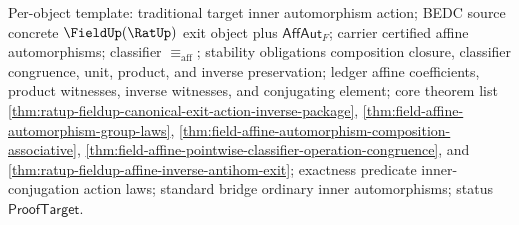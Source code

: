 Per-object template: traditional target inner automorphism action; BEDC source
concrete $\FieldUp(\RatUp)$ exit object plus $\mathsf{AffAut}_F$; carrier
certified affine automorphisms; classifier $\equiv_{\mathrm{aff}}$; stability
obligations composition closure, classifier congruence, unit, product, and
inverse preservation; ledger affine coefficients, product witnesses, inverse
witnesses, and conjugating element; core theorem list
\autoref{thm:ratup-fieldup-canonical-exit-action-inverse-package},
\autoref{thm:field-affine-automorphism-group-laws},
\autoref{thm:field-affine-automorphism-composition-associative},
\autoref{thm:field-affine-pointwise-classifier-operation-congruence}, and
\autoref{thm:ratup-fieldup-affine-inverse-antihom-exit}; exactness predicate
inner-conjugation action laws; standard bridge ordinary inner automorphisms;
status $\mathsf{ProofTarget}$.

